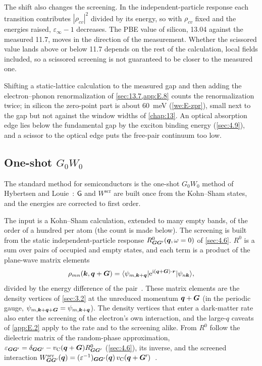 The shift also changes the screening. In the independent-particle response each transition contributes $|\rho_{cv}|^2$ divided by its energy, so with $\rho_{cv}$ fixed and the energies raised, $\varepsilon_\infty - 1$ decreases. The PBE value of silicon, 13.04 against the measured 11.7, moves in the direction of the measurement. Whether the scissored value lands above or below 11.7 depends on the rest of the calculation, local fields included, so a scissored screening is not guaranteed to be closer to the measured one.

Shifting a static-lattice calculation to the measured gap and then adding the electron--phonon renormalization of \cref{sec:13.7,app:E.8} counts the renormalization twice; in silicon the zero-point part is about \SI{60}{meV} (\cref{we:E-zpr}), small next to the gap but not against the window widths of \cref{chap:13}. An optical absorption edge lies below the fundamental gap by the exciton binding energy (\cref{sec:4.9}), and a scissor to the optical edge puts the free-pair continuum too low.

\subsection{One-shot \texorpdfstring{$G_0W_0$}{G0W0}}

The standard method for semiconductors is the one-shot $G_0W_0$ method of Hybertsen and Louie~\cite{hybertsen1986electron}: $\mathsf{G}$ and $W^{\mathrm{scr}}$ are built once from the Kohn--Sham states, and the energies are corrected to first order.

The input is a Kohn--Sham calculation, extended to many empty bands, of the order of a hundred per atom (the count is made below). The screening is built from the static independent-particle response $R^0_{\bm{G}\bm{G}'}(\bm{q}, \omega = 0)$ of \cref{sec:4.6}. $R^0$ is a sum over pairs of occupied and empty states, and each term is a product of the plane-wave matrix elements
\begin{equation}
  \rho_{mn}(\bm{k}, \bm{q} + \bm{G}) = \langle\psi_{m,\bm{k}+\bm{q}}|\mathrm{e}^{\mathrm{i}(\bm{q}+\bm{G})\cdot\bm{r}}|\psi_{n\bm{k}}\rangle ,
  \label{eq:E.3-M}
\end{equation}
divided by the energy difference of the pair~\cite[Eqs.~(7) and (8)]{deslippe2012berkeleygw}. These matrix elements are the density vertices of \cref{sec:3.2} at the unreduced momentum $\bm{q} + \bm{G}$ (in the periodic gauge, $\psi_{m,\bm{k}+\bm{q}+\bm{G}} = \psi_{m,\bm{k}+\bm{q}}$). The density vertices that enter a dark-matter rate also enter the screening of the electron's own interaction, and the large-$q$ caveats of \cref{app:E.2} apply to the rate and to the screening alike. From $R^0$ follow the dielectric matrix of the random-phase approximation, $\varepsilon_{\bm{G}\bm{G}'} = \delta_{\bm{G}\bm{G}'} - v_{\mathrm{C}}(\bm{q} + \bm{G})R^0_{\bm{G}\bm{G}'}$ (\cref{sec:4.6}), its inverse, and the screened interaction $W^{\mathrm{scr}}_{\bm{G}\bm{G}'}(\bm{q}) = (\varepsilon^{-1})_{\bm{G}\bm{G}'}(\bm{q})\,v_{\mathrm{C}}(\bm{q} + \bm{G}')$~\cite[Eq.~(12)]{deslippe2012berkeleygw}.

